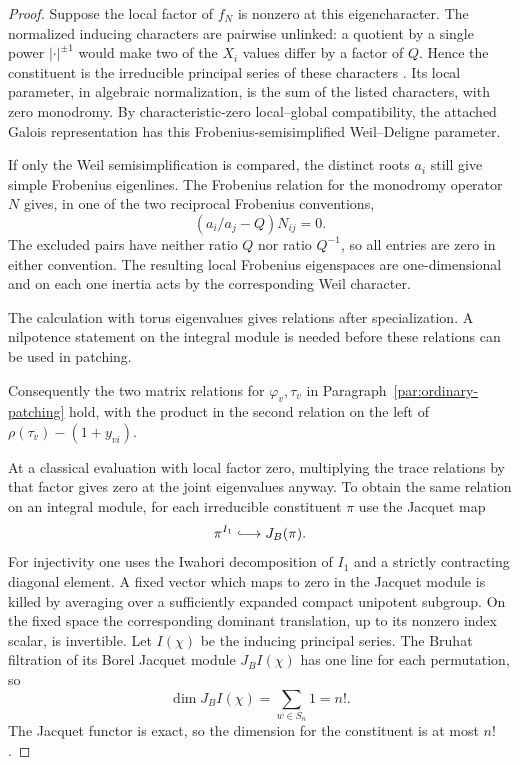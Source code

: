 \begin{proof}
Suppose the local factor of \(f_N\) is nonzero at this
eigencharacter. The normalized inducing characters are
pairwise unlinked: a quotient by a single power
\(|\cdot|^{\pm1}\) would make two of the \(X_i\) values
differ by a factor of \(Q\). Hence the constituent is
the irreducible principal series of these characters
\cite[Theorem 4.2]{zelevinsky}. Its local parameter, in
algebraic normalization, is the sum of the listed
characters, with zero monodromy. By characteristic-zero
local--global compatibility, the attached Galois
representation has this Frobenius-semisimplified
Weil--Deligne parameter.

If only the Weil semisimplification is compared, the
distinct roots \(a_i\) still give simple Frobenius eigenlines.
The Frobenius relation for the monodromy operator \(N\)
gives, in one of the two reciprocal Frobenius conventions,
\[
                    (a_i/a_j-Q)N_{ij}=0 .
\]
The excluded pairs have neither ratio \(Q\) nor ratio
\(Q^{-1}\), so all entries are zero in either convention. The resulting local
Frobenius eigenspaces are one-dimensional and on each
one inertia acts by the corresponding Weil character.

The calculation with torus eigenvalues gives relations after specialization. A nilpotence statement on the integral module is needed before these relations can be used in patching.


Consequently the two matrix relations for
\(\varphi_v,\tau_v\) in Paragraph~\ref{par:ordinary-patching}
hold, with the product in the second relation on the
left of \(\rho(\tau_v)-(1+y_{vi})\).

At a classical evaluation with local factor zero,
multiplying the trace relations by that factor gives
zero at the joint eigenvalues anyway. To obtain the
same relation on an integral module, for each irreducible constituent \(\pi\) use the Jacquet map
\[
 \pi^{I_1}\lhook\joinrel\longrightarrow J_B(\pi).
\]
For injectivity
one uses the Iwahori decomposition of \(I_1\) and a
strictly contracting diagonal element. A fixed vector
which maps to zero in the Jacquet module is killed by
averaging over a sufficiently expanded compact unipotent
subgroup. On the fixed space the corresponding
dominant translation, up to its nonzero index scalar,
is invertible. Let \(I(\chi)\) be the inducing principal series. The Bruhat filtration of its Borel Jacquet module \(J_BI(\chi)\) has one line for each permutation, so
\[
 \dim J_BI(\chi)=\sum_{w\in S_n}1=n!.
\]
The Jacquet functor is exact, so the dimension for the
constituent is at most \(n!\)
\cite[Sections 2.9 and 2.12]{bernstein-zelevinsky}.


\end{proof}
